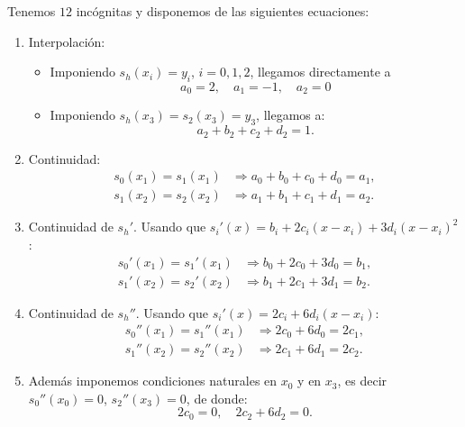    Tenemos $12$ incógnitas y disponemos de las siguientes ecuaciones:
   \begin{enumerate}
   \item Interpolación:
     \begin{itemize}
     \item Imponiendo $s_h(x_i)=y_i$, $i=0,1,2$, llegamos directamente
       a
       \begin{equation*}
         a_0=2, \quad a_1=-1, \quad a_2=0
       \end{equation*}
     \item Imponiendo $s_h(x_3)=s_2(x_3)=y_3$, llegamos a:
       \begin{equation*}
         a_2+b_2+c_2+d_2=1.
       \end{equation*}
     \end{itemize}
   \item Continuidad:
     \begin{align*}
       s_0(x_1)=s_1(x_1) &\Rightarrow a_0+b_0+c_0+d_0 = a_1,
       \\
       s_1(x_2)=s_2(x_2) &\Rightarrow a_1+b_1+c_1+d_1 = a_2.
     \end{align*}
   \item Continuidad de $s_h'$. Usando que
     $s_i'(x)=b_i+2c_i(x-x_i)+3d_i(x-x_i)^2$:
     \begin{align*}
       s_0'(x_1)=s_1'(x_1) &\Rightarrow b_0+2c_0+3d_0 = b_1,
       \\
       s_1'(x_2)=s_2'(x_2) &\Rightarrow b_1+2c_1+3d_1 = b_2.
     \end{align*}
   \item Continuidad de $s_h''$. Usando que
     $s_i'(x)=2c_i+6d_i(x-x_i)$:
     \begin{align*}
       s_0''(x_1)=s_1''(x_1) &\Rightarrow 2c_0+6d_0 = 2c_1,
       \\
       s_1''(x_2)=s_2''(x_2) &\Rightarrow 2c_1+6d_1 = 2c_2.
     \end{align*}
   \item Además imponemos condiciones naturales en $x_0$ y en $x_3$, es decir
     $s_0''(x_0)=0$, $s_2''(x_3)=0$, de donde:
     \begin{equation*}
       2c_0 = 0, \quad 2c_2 + 6 d_2 =0.
     \end{equation*}
   \end{enumerate}

